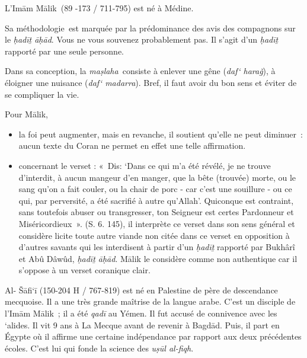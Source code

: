 
L'Imām Mālik~(89 -173 / 711-795) est né à Médine.

Sa méthodologie\emph{~}est marquée par la prédominance des avis des
compagnons sur le \emph{ḥadīṯ āḥād}. Vous ne vous souvenez probablement
pas. Il s'agit d'un \emph{ḥadīṯ} rapporté par une seule personne.

Dans sa conception, la \emph{maṣlaha}~consiste à enlever une gêne
(\emph{daf` haraǧ}), à éloigner une nuisance (\emph{daf` madarra}).
Bref, il faut avoir du bon sens et éviter de se compliquer la vie.

Pour Mālik,

\begin{itemize}
\item
  la foi peut augmenter, mais en revanche, il soutient qu'elle ne peut
  diminuer~: aucun texte du Coran ne permet en effet une telle
  affirmation.
\item
  concernant le verset : «~Dis: `Dans ce qui m'a été révélé, je ne
  trouve d'interdit, à aucun mangeur d'en manger, que la bête (trouvée)
  morte, ou le sang qu'on a fait couler, ou la chair de porc - car c'est
  une souillure - ou ce qui, par perversité, a été sacriﬁé à autre
  qu'Allah'. Quiconque est contraint, sans toutefois abuser ou
  transgresser, ton Seigneur est certes Pardonneur et Miséricordieux~».
  (S. 6. 145), il interprète ce verset dans son sens général et
  considère licite toute autre viande non citée dans ce verset en
  opposition à d'autres savants qui les interdisent à partir d'un
  \emph{ḥadīṯ} rapporté par Bukhârî et Abû Dâwûd, \emph{ḥadīṯ āḥād}.
  Mālik le considère comme non authentique car il s'oppose à un verset
  coranique clair.
\end{itemize}


Al- Šāfi`ī (150-204 H / 767-819) est né en Palestine de père de
descendance mecquoise. Il a une très grande maîtrise de la langue arabe.
C'est un disciple de l'Imām Mālik~; il a été \emph{qadī} au Yémen. Il
fut accusé de connivence avec les `alides. Il vit 9 ans à La Mecque
avant de revenir à Bagdād. Puis, il part en Égypte où il affirme une
certaine indépendance par rapport aux deux précédentes écoles. C'est lui
qui fonde la science des \emph{uṣūl al-fiqh}.

